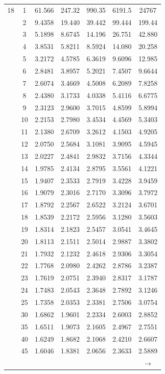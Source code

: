 \begin{minipage}{0.49\textwidth}
\begin{center}
\begin{tabular}{ccccccc}
			\midrule
			18 & 1 & 61.566 & 247.32 & 990.35 & 6191.5 & 24767 \\
			& 2 & 9.4358 & 19.440 & 39.442 & 99.444 & 199.44 \\
			& 3 & 5.1898 & 8.6745 & 14.196 & 26.751 & 42.880 \\
			& 4 & 3.8531 & 5.8211 & 8.5924 & 14.080 & 20.258 \\
			& 5 & 3.2172 & 4.5785 & 6.3619 & 9.6096 & 12.985 \\
			& 6 & 2.8481 & 3.8957 & 5.2021 & 7.4507 & 9.6644 \\
			& 7 & 2.6074 & 3.4669 & 4.5008 & 6.2089 & 7.8258 \\
			& 8 & 2.4380 & 3.1733 & 4.0338 & 5.4116 & 6.6775 \\
			& 9 & 2.3123 & 2.9600 & 3.7015 & 4.8599 & 5.8994 \\[5pt]
			& 10 & 2.2153 & 2.7980 & 3.4534 & 4.4569 & 5.3403 \\
			& 11 & 2.1380 & 2.6709 & 3.2612 & 4.1503 & 4.9205 \\
			& 12 & 2.0750 & 2.5684 & 3.1081 & 3.9095 & 4.5945 \\
			& 13 & 2.0227 & 2.4841 & 2.9832 & 3.7156 & 4.3344 \\
			& 14 & 1.9785 & 2.4134 & 2.8795 & 3.5561 & 4.1221 \\
			& 15 & 1.9407 & 2.3533 & 2.7919 & 3.4228 & 3.9459 \\
			& 16 & 1.9079 & 2.3016 & 2.7170 & 3.3096 & 3.7972 \\
			& 17 & 1.8792 & 2.2567 & 2.6522 & 3.2124 & 3.6701 \\
			& 18 & 1.8539 & 2.2172 & 2.5956 & 3.1280 & 3.5603 \\
			& 19 & 1.8314 & 2.1823 & 2.5457 & 3.0541 & 3.4645 \\[5pt]
			& 20 & 1.8113 & 2.1511 & 2.5014 & 2.9887 & 3.3802 \\
			& 21 & 1.7932 & 2.1232 & 2.4618 & 2.9306 & 3.3054 \\
			& 22 & 1.7768 & 2.0980 & 2.4262 & 2.8786 & 3.2387 \\
			& 23 & 1.7619 & 2.0751 & 2.3940 & 2.8317 & 3.1787 \\
			& 24 & 1.7483 & 2.0543 & 2.3648 & 2.7892 & 3.1246 \\
			& 25 & 1.7358 & 2.0353 & 2.3381 & 2.7506 & 3.0754 \\
			& 30 & 1.6862 & 1.9601 & 2.2334 & 2.6003 & 2.8852 \\
			& 35 & 1.6511 & 1.9073 & 2.1605 & 2.4967 & 2.7551 \\
			& 40 & 1.6249 & 1.8682 & 2.1068 & 2.4210 & 2.6607 \\
			& 45 & 1.6046 & 1.8381 & 2.0656 & 2.3633 & 2.5889 \\
			&  &  &  &  &  & $\rightarrow$ \\
		\end{tabular}
	\end{center}
\end{minipage}



